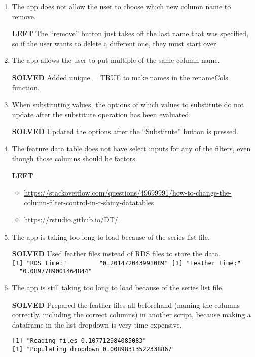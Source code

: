 \documentclass[]{article}
\providecommand{\tightlist}{%
  \setlength{\itemsep}{0pt}\setlength{\parskip}{0pt}}
\begin{document}
\begin{enumerate}
\def\labelenumi{\arabic{enumi}.}
\item
  The app does not allow the user to choose which new column name to
  remove.

  \textbf{LEFT} The ``remove'' button just takes off the last name that
  was specified, so if the user wants to delete a different one, they
  must start over.
\item
  The app allows the user to put multiple of the same column name.

  \textbf{SOLVED} Added unique = TRUE to make.names in the renameCols
  function.
\item
  When substituting values, the options of which values to substitute do
  not update after the substitute operation has been evaluated.

  \textbf{SOLVED} Updated the options after the ``Substitute'' button is
  pressed.
\item
  The feature data table does not have select inputs for any of the
  filters, even though those columns should be factors.

  \textbf{LEFT}

  \begin{itemize}
  \tightlist
  \item
    \url{https://stackoverflow.com/questions/49699991/how-to-change-the-column-filter-control-in-r-shiny-datatables}
  \item
    \url{https://rstudio.github.io/DT/}
  \end{itemize}
\item
  The app is taking too long to load because of the series list file.

  \textbf{SOLVED} Used feather files instead of RDS files to store the
  data.
  \texttt{{[}1{]}\ "RDS\ time:"\ \ \ \ \ \ \ \ \ "0.201472043991089"\ {[}1{]}\ "Feather\ time:"\ \ \ \ \ \ "0.0897789001464844"}
\item
  The app is still taking too long to load because of the series list
  file.

  \textbf{SOLVED} Prepared the feather files all beforehand (naming the
  columns correctly, including the correct columns) in another script,
  because making a dataframe in the list dropdown is very
  time-expensive.

\begin{verbatim}
[1] "Reading files 0.107712984085083"
[1] "Populating dropdown 0.00898313522338867"
\end{verbatim}
\end{enumerate}
\end{document}
